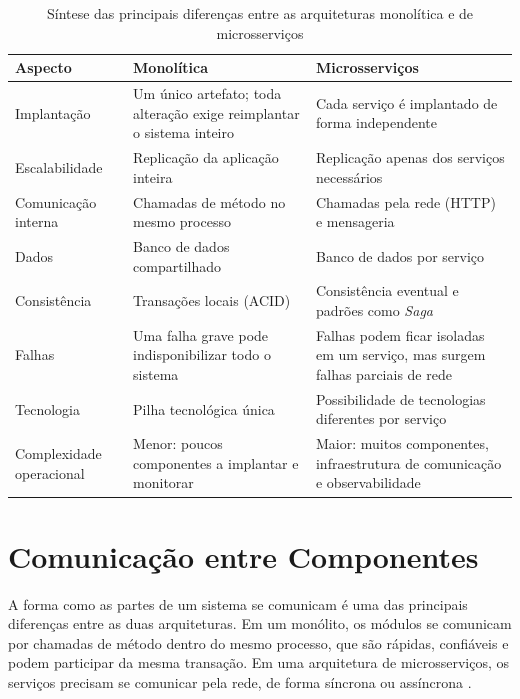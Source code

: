 \begin{table}[htbp]
\centering
\caption{Síntese das principais diferenças entre as arquiteturas monolítica e de microsserviços}
\label{tab:comparacao-arquiteturas}
\small
\begin{tabular}{|>{\raggedright\arraybackslash}p{3.2cm}|>{\raggedright\arraybackslash}p{5.9cm}|>{\raggedright\arraybackslash}p{5.9cm}|}
\hline
\textbf{Aspecto} & \textbf{Monolítica} & \textbf{Microsserviços} \\ \hline
Implantação & Um único artefato; toda alteração exige reimplantar o sistema inteiro & Cada serviço é implantado de forma independente \\ \hline
Escalabilidade & Replicação da aplicação inteira & Replicação apenas dos serviços necessários \\ \hline
Comunicação interna & Chamadas de método no mesmo processo & Chamadas pela rede (HTTP) e mensageria \\ \hline
Dados & Banco de dados compartilhado & Banco de dados por serviço \\ \hline
Consistência & Transações locais (ACID) & Consistência eventual e padrões como \textit{Saga} \\ \hline
Falhas & Uma falha grave pode indisponibilizar todo o sistema & Falhas podem ficar isoladas em um serviço, mas surgem falhas parciais de rede \\ \hline
Tecnologia & Pilha tecnológica única & Possibilidade de tecnologias diferentes por serviço \\ \hline
Complexidade operacional & Menor: poucos componentes a implantar e monitorar & Maior: muitos componentes, infraestrutura de comunicação e observabilidade \\ \hline
\end{tabular}
\par{}
\end{table}

\section{Comunicação entre Componentes}

A forma como as partes de um sistema se comunicam é uma das principais diferenças entre as
duas arquiteturas. Em um monólito, os módulos se comunicam por chamadas de método dentro do
mesmo processo, que são rápidas, confiáveis e podem participar da mesma transação. Em uma
arquitetura de microsserviços, os serviços precisam se comunicar pela rede, de forma síncrona
ou assíncrona \cite{richardson2018}.

